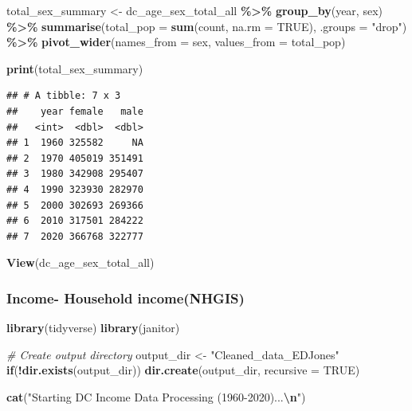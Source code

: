 \documentclass[
]{article}
\newenvironment{Shaded}{\begin{snugshade}}{\end{snugshade}}
\newcommand{\AttributeTok}[1]{\textcolor[rgb]{0.13,0.29,0.53}{#1}}
\newcommand{\CommentTok}[1]{\textcolor[rgb]{0.56,0.35,0.01}{\textit{#1}}}
\newcommand{\ConstantTok}[1]{\textcolor[rgb]{0.56,0.35,0.01}{#1}}
\newcommand{\ControlFlowTok}[1]{\textcolor[rgb]{0.13,0.29,0.53}{\textbf{#1}}}
\newcommand{\FunctionTok}[1]{\textcolor[rgb]{0.13,0.29,0.53}{\textbf{#1}}}
\newcommand{\NormalTok}[1]{#1}
\newcommand{\OtherTok}[1]{\textcolor[rgb]{0.56,0.35,0.01}{#1}}
\newcommand{\SpecialCharTok}[1]{\textcolor[rgb]{0.81,0.36,0.00}{\textbf{#1}}}
\newcommand{\StringTok}[1]{\textcolor[rgb]{0.31,0.60,0.02}{#1}}
\begin{document}
\begin{Shaded}
\begin{Highlighting}[]
\NormalTok{total\_sex\_summary }\OtherTok{\textless{}{-}}\NormalTok{ dc\_age\_sex\_total\_all }\SpecialCharTok{\%\textgreater{}\%}
  \FunctionTok{group\_by}\NormalTok{(year, sex) }\SpecialCharTok{\%\textgreater{}\%}
  \FunctionTok{summarise}\NormalTok{(}\AttributeTok{total\_pop =} \FunctionTok{sum}\NormalTok{(count, }\AttributeTok{na.rm =} \ConstantTok{TRUE}\NormalTok{), }\AttributeTok{.groups =} \StringTok{"drop"}\NormalTok{) }\SpecialCharTok{\%\textgreater{}\%}
  \FunctionTok{pivot\_wider}\NormalTok{(}\AttributeTok{names\_from =}\NormalTok{ sex, }\AttributeTok{values\_from =}\NormalTok{ total\_pop)}

\FunctionTok{print}\NormalTok{(total\_sex\_summary)}
\end{Highlighting}
\end{Shaded}

\begin{verbatim}
## # A tibble: 7 x 3
##    year female   male
##   <int>  <dbl>  <dbl>
## 1  1960 325582     NA
## 2  1970 405019 351491
## 3  1980 342908 295407
## 4  1990 323930 282970
## 5  2000 302693 269366
## 6  2010 317501 284222
## 7  2020 366768 322777
\end{verbatim}

\begin{Shaded}
\begin{Highlighting}[]
\FunctionTok{View}\NormalTok{(dc\_age\_sex\_total\_all)}
\end{Highlighting}
\end{Shaded}

\subsubsection{Income- Household
income(NHGIS)}\label{income--household-incomenhgis}

\begin{Shaded}
\begin{Highlighting}[]
\FunctionTok{library}\NormalTok{(tidyverse)}
\FunctionTok{library}\NormalTok{(janitor)}


\CommentTok{\# Create output directory}
\NormalTok{output\_dir }\OtherTok{\textless{}{-}} \StringTok{"Cleaned\_data\_EDJones"}
\ControlFlowTok{if}\NormalTok{(}\SpecialCharTok{!}\FunctionTok{dir.exists}\NormalTok{(output\_dir)) }\FunctionTok{dir.create}\NormalTok{(output\_dir, }\AttributeTok{recursive =} \ConstantTok{TRUE}\NormalTok{)}

\FunctionTok{cat}\NormalTok{(}\StringTok{"Starting DC Income Data Processing (1960{-}2020)...}\SpecialCharTok{\textbackslash{}n}\StringTok{"}\NormalTok{)}
\end{Highlighting}
\end{Shaded}
\end{document}

